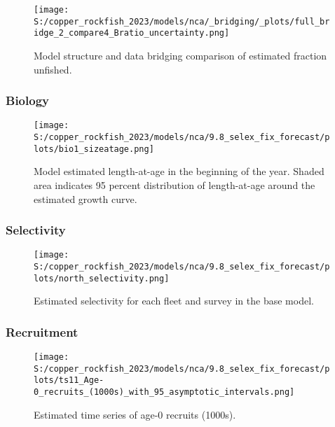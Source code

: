 \documentclass[11pt,
  english,
  letterpaper,
]{article}
\begin{document}
\pagebreak

\begin{figure}
\centering
\texttt{[image: S:/copper\_rockfish\_2023/models/nca/\_bridging/\_plots/full\_bridge\_2\_compare4\_Bratio\_uncertainty.png]}
\caption{Model structure and data bridging comparison of estimated fraction unfished.\label{fig:data-bridge-depl-2}}
\end{figure}

\pagebreak

\pagebreak

\hypertarget{biology-1}{%
\subsubsection{Biology}\label{biology-1}}

\begin{figure}
\centering
\texttt{[image: S:/copper\_rockfish\_2023/models/nca/9.8\_selex\_fix\_forecast/plots/bio1\_sizeatage.png]}
\caption{Model estimated length-at-age in the beginning of the year. Shaded area indicates 95 percent distribution of length-at-age around the estimated growth curve.\label{fig:mod-est-len-age}}
\end{figure}

\pagebreak

\hypertarget{selectivity}{%
\subsubsection{Selectivity}\label{selectivity}}

\begin{figure}
\centering
\texttt{[image: S:/copper\_rockfish\_2023/models/nca/9.8\_selex\_fix\_forecast/plots/north\_selectivity.png]}
\caption{Estimated selectivity for each fleet and survey in the base model.\label{fig:est-selex}}
\end{figure}

\pagebreak

\hypertarget{recruitment-1}{%
\subsubsection{Recruitment}\label{recruitment-1}}

\begin{figure}
\centering
\texttt{[image: S:/copper\_rockfish\_2023/models/nca/9.8\_selex\_fix\_forecast/plots/ts11\_Age-0\_recruits\_(1000s)\_with\_95\_asymptotic\_intervals.png]}
\caption{Estimated time series of age-0 recruits (1000s).\label{fig:recruits}}
\end{figure}
\end{document}

